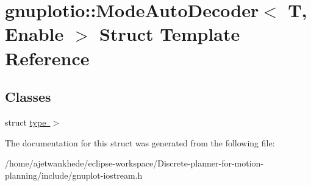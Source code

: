 \hypertarget{structgnuplotio_1_1ModeAutoDecoder}{}\section{gnuplotio\+:\+:Mode\+Auto\+Decoder$<$ T, Enable $>$ Struct Template Reference}
\label{structgnuplotio_1_1ModeAutoDecoder}
\subsection*{Classes}
\begin{DoxyCompactItemize}
\item 
struct \mbox{\hyperlink{structgnuplotio_1_1ModeAutoDecoder_1_1type_01_4}{type $>$}}
\end{DoxyCompactItemize}


The documentation for this struct was generated from the following file\+:\begin{DoxyCompactItemize}
\item 
/home/ajetwankhede/eclipse-\/workspace/\+Discrete-\/planner-\/for-\/motion-\/planning/include/gnuplot-\/iostream.\+h\end{DoxyCompactItemize}
